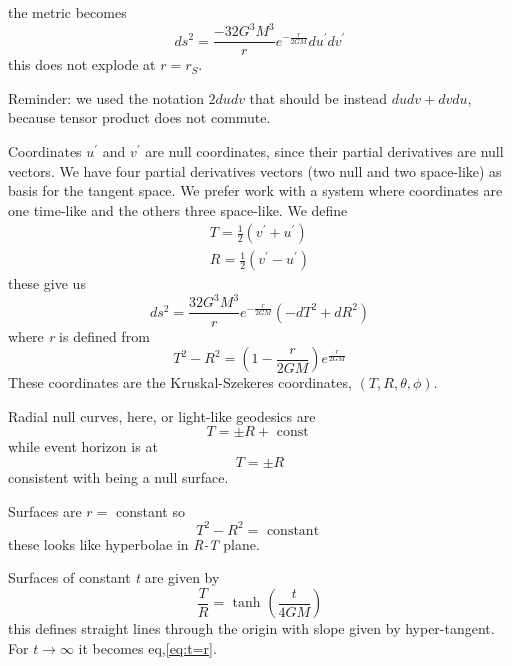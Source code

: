 the metric becomes
\begin{equation}
ds^{2} = \frac{-32G^{3}M^{3}}{r} e ^{ -\frac{r}{2GM}} du^{\prime }dv^{\prime }
\end{equation}
this does not explode at $r = r_{S}$.\par
Reminder: we used the notation $2dudv$ that should be instead $dudv +dvdu$, because tensor product does not commute.\par
Coordinates $u^{\prime }$ and $v^{\prime }$ are null coordinates, since their partial derivatives are null vectors. We have four partial derivatives vectors (two null and two space-like) as basis for the tangent space. We prefer work with a system where coordinates are one time-like and the others three space-like. We define
\begin{gather*}
T = \frac{1}{2} \left( v^{\prime }+u^{\prime } \right) \\
R = \frac{1}{2} \left( v^{\prime }-u^{\prime } \right)
\end{gather*}
these give us
\begin{equation}
ds^{2 } = \frac{32G^{3}M^{3}}{r}e^{-\frac{r}{2GM}}\left( -dT^{2}+dR^{2} \right)
\end{equation}
where \emph{r} is defined from
\begin{equation}
T^{2}-R^{2} = \left( 1- \frac{r}{2GM} \right)e^{\frac{r}{2GM}}
\end{equation}
These coordinates are the Kruskal-Szekeres coordinates, $\left( T,R,\theta,\phi  \right)$.\par
Radial null curves, here, or light-like geodesics are
\begin{equation}
T = \pm R + \text{ const }
\end{equation}
while event horizon is at
\begin{equation}\label{eq:t=r}
T = \pm R
\end{equation}
consistent with being a null surface.\par
Surfaces are $r =$ constant so
\begin{equation}
T^{2} - R^{2} = \text{ constant }
\end{equation}
these looks like hyperbolae in \emph{R-T} plane.\par
Surfaces of constant \emph{t} are given by
\begin{equation}
\frac{T}{R} = \text{ tanh }\left( \frac{t}{4GM} \right)
\end{equation}
this defines straight lines through the origin with slope given by hyper-tangent. For $t\to \infty$ it becomes eq,\ref{eq:t=r}.\par
